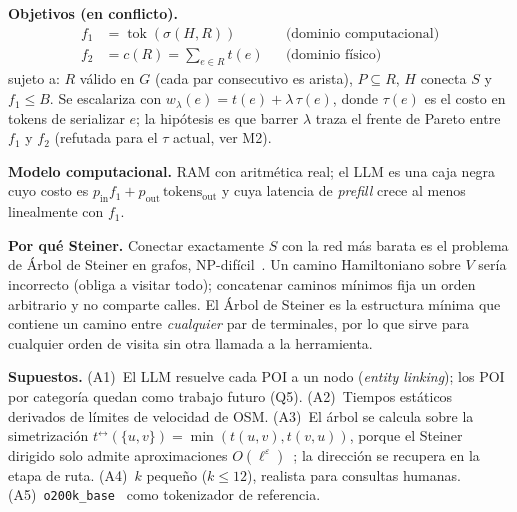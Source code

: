 \documentclass[conference,10pt]{IEEEtran}
\newcommand{\tok}{\operatorname{tok}}
\newcommand{\Sterm}{S}
\begin{document}
\textbf{Objetivos (en conflicto).}
\begin{align}
f_1 &= \tok(\sigma(H,R)) && \text{(dominio computacional)}\\
f_2 &= c(R)=\textstyle\sum_{e\in R} t(e) && \text{(dominio físico)}
\end{align}
sujeto a: $R$ válido en $G$ (cada par consecutivo es arista), $P\subseteq R$, $H$ conecta $\Sterm$ y $f_1\le B$. Se escalariza con $w_\lambda(e)=t(e)+\lambda\,\tau(e)$, donde $\tau(e)$ es el costo en tokens de serializar $e$; la hipótesis es que barrer $\lambda$ traza el frente de Pareto entre $f_1$ y $f_2$ (refutada para el $\tau$ actual, ver M2).

\textbf{Modelo computacional.} RAM con aritmética real; el LLM es una caja negra cuyo costo es $p_\text{in}f_1+p_\text{out}\,\text{tokens}_\text{out}$ y cuya latencia de \emph{prefill} crece al menos linealmente con $f_1$.

\textbf{Por qué Steiner.} Conectar exactamente $\Sterm$ con la red más barata es el problema de Árbol de Steiner en grafos, NP-difícil~\cite{karp1972}. Un camino Hamiltoniano sobre $V$ sería incorrecto (obliga a visitar todo); concatenar caminos mínimos fija un orden arbitrario y no comparte calles. El Árbol de Steiner es la estructura mínima que contiene un camino entre \emph{cualquier} par de terminales, por lo que sirve para cualquier orden de visita sin otra llamada a la herramienta.

\textbf{Supuestos.} (A1)~El LLM resuelve cada POI a un nodo (\emph{entity linking}); los POI por categoría quedan como trabajo futuro (Q5). (A2)~Tiempos estáticos derivados de límites de velocidad de OSM. (A3)~El árbol se calcula sobre la simetrización $t^{\leftrightarrow}(\{u,v\})=\min(t(u,v),t(v,u))$, porque el Steiner dirigido solo admite aproximaciones $O(\ell^\varepsilon)$~\cite{charikar1999}; la dirección se recupera en la etapa de ruta. (A4)~$k$ pequeño ($k\le 12$), realista para consultas humanas. (A5)~\texttt{o200k\_base}~\cite{tiktoken} como tokenizador de referencia.
\end{document}
